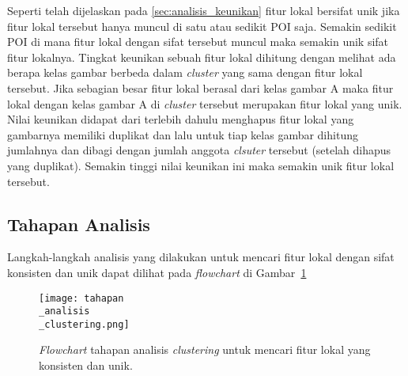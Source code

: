 Seperti telah dijelaskan pada \ref{sec:analisis_keunikan} fitur lokal bersifat unik jika fitur lokal tersebut hanya muncul di satu atau sedikit POI saja. Semakin sedikit POI di mana fitur lokal dengan sifat tersebut muncul maka semakin unik sifat fitur lokalnya. Tingkat keunikan sebuah fitur lokal dihitung dengan melihat ada berapa kelas gambar berbeda dalam \textit{cluster} yang sama dengan fitur lokal tersebut. Jika sebagian besar fitur lokal berasal dari kelas gambar A maka fitur lokal dengan kelas gambar A di \textit{cluster} tersebut merupakan fitur lokal yang unik.  Nilai keunikan didapat dari terlebih dahulu menghapus fitur lokal yang gambarnya memiliki duplikat dan lalu untuk tiap kelas gambar dihitung jumlahnya dan dibagi dengan jumlah anggota \textit{clsuter} tersebut (setelah dihapus yang duplikat). Semakin tinggi nilai keunikan ini maka semakin unik fitur lokal tersebut.

\subsection{Tahapan Analisis}
\label{subsec:tahapan_analisis_clustering}
Langkah-langkah analisis yang dilakukan untuk mencari fitur lokal dengan sifat konsisten dan unik dapat dilihat pada \textit{flowchart} di Gambar~\ref{fig:tahapan_analisis_clustering}
\begin{figure}[H]
	\centering
	\texttt{[image: tahapan\\\_analisis\\\_clustering.png]}
	\caption{\textit{Flowchart} tahapan analisis \textit{clustering} untuk mencari fitur lokal yang konsisten dan unik.}
	\label{fig:tahapan_analisis_clustering}
\end{figure}

